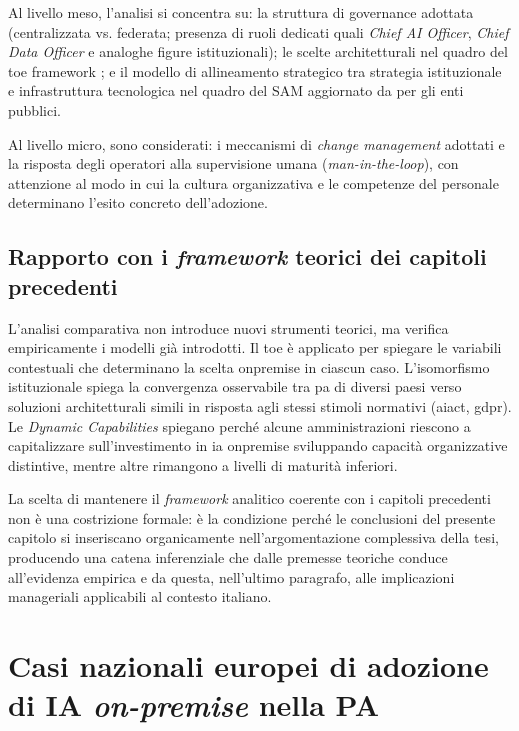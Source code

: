 Al livello meso, l'analisi si concentra su: la struttura di governance
adottata (centralizzata vs. federata; presenza di ruoli dedicati quali
\textit{Chief AI Officer}, \textit{Chief Data Officer} e analoghe figure
istituzionali); le scelte architetturali nel quadro del \gls{toe} framework
\parencite{TornatzkyFleischer1990}; e il modello di allineamento strategico
tra strategia istituzionale e infrastruttura tecnologica nel quadro del SAM
aggiornato da \textcite{CordeiroSAM2019} per gli enti pubblici.

Al livello micro, sono considerati: i meccanismi di
\textit{change management} adottati \parencite{FernandezRainey2006} e la
risposta degli operatori alla supervisione umana (\textit{man-in-the-loop}),
con attenzione al modo in cui la cultura organizzativa e le competenze
del personale determinano l'esito concreto dell'adozione.

\subsection{Rapporto con i \textit{framework} teorici dei capitoli precedenti}

L'analisi comparativa non introduce nuovi strumenti teorici, ma verifica
empiricamente i modelli già introdotti. Il \gls{toe} \parencite{TornatzkyFleischer1990}
è applicato per spiegare le variabili contestuali che determinano la scelta
\gls{onpremise} in ciascun caso. L'isomorfismo istituzionale
\parencite{DiMaggioPow1983} spiega la convergenza osservabile tra \gls{pa} di diversi
paesi verso soluzioni architetturali simili in risposta agli stessi stimoli
normativi (\gls{aiact}, \gls{gdpr}). Le \textit{Dynamic Capabilities} \parencite{Teece2007}
spiegano perché alcune amministrazioni riescono a capitalizzare sull'investimento
in \gls{ia} \gls{onpremise} sviluppando capacità organizzative distintive, mentre
altre rimangono a livelli di maturità inferiori.

La scelta di mantenere il \textit{framework} analitico coerente con i capitoli
precedenti non è una costrizione formale: è la condizione perché le conclusioni del
presente capitolo si inseriscano organicamente nell'argomentazione complessiva
della tesi, producendo una catena inferenziale che dalle premesse teoriche conduce
all'evidenza empirica e da questa, nell'ultimo paragrafo, alle implicazioni
manageriali applicabili al contesto italiano.

\section{Casi nazionali europei di adozione di IA \textit{on-premise} nella PA}
\label{sec:casi-nazionali}

